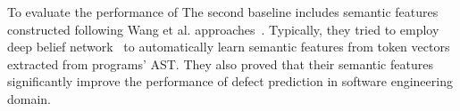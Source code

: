 
To evaluate the performance of  
The second baseline includes semantic features constructed following Wang et al. approaches~\cite{wang2016automatically}. Typically, they tried to employ deep belief network~\cite{hinton2009deep} to automatically learn semantic features from token vectors extracted from programs' AST. They also proved that their semantic features significantly improve the performance of defect prediction in software engineering domain. 

